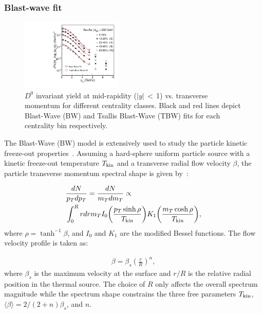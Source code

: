 \documentclass[%
 reprint,	
 amsmath,amssymb,
 aps,
 prc,
]{revtex4-1}
\begin{document}
\subsubsection{Blast-wave fit}
\label{result:collectivity:BW}

\begin{figure}
\centering
\includegraphics[width=0.43\textwidth]{fig/BWFit.pdf}
\caption{$D^{0}$ invariant yield at mid-rapidity ($|y|$\,$<$\,1) vs. transverse momentum for different centrality classes. Black and red lines depict Blast-Wave (BW) and Tsallis Blast-Wave (TBW) fits for each centrality bin respectively.}
\label{fig:BWFit} 
\end{figure}

The Blast-Wave (BW) model is extensively used to study the particle kinetic freeze-out properties~\cite{Adams:2003xp,Adamczyk:2017iwn}. Assuming a hard-sphere uniform particle source with a kinetic freeze-out temperature $T_{\rm kin}$ and a transverse radial flow velocity $\beta$, the particle transverse momentum spectral shape is given by~\cite{Schnedermann:1993ws}:

\begin{equation}
  \begin{aligned}
  & \frac{dN}{p_{T}dp_{T}} = \frac{dN}{m_{T}dm_{T}} \propto \\
  & \int_0^R rdr m_{T} I_0\bigg(\frac{p_{T}\sinh\rho}{T_{\rm kin}}\bigg) K_1\bigg(\frac{m_{T}\cosh\rho}{T_{\rm kin}}\bigg),
  \end{aligned}
\label{equ:equation8}
\end{equation}
where $\rho = \tanh^{-1}\beta$, and $I_0$ and $K_1$ are the modified Bessel functions. The flow velocity profile is taken as:

\begin{equation}
  \begin{aligned}
\beta = \beta_{s}\left(\frac{r}{R}\right)^{n},
  \end{aligned}
\label{equ:equation9}
\end{equation}
where $\beta_{s}$ is the maximum velocity at the surface and $r/R$ is the relative radial position in the thermal source. The choice of $R$ only affects the overall spectrum magnitude while the spectrum shape constrains the three free parameters $T_{\rm kin}$, $\langle\beta\rangle=2/(2+n)\beta_{s}$, and $n$.
\end{document}
